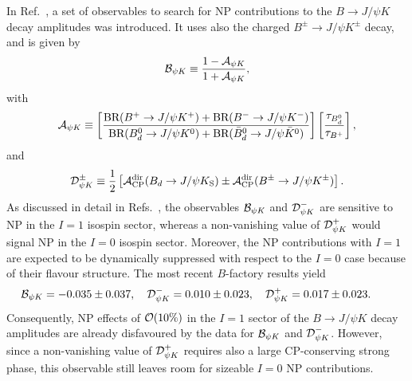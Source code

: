 \documentclass[11pt]{cernrep}
\begin{document}
In Ref.~\cite{FM-BpsiK}, a set of observables to search for NP contributions to 
the $B\to J/\psi K $ decay amplitudes was introduced. It
uses also the charged $B^\pm\to J/\psi K^\pm$ decay, and is given by
\begin{equation}\label{BpsiK}
{\cal B}_{\psi K}\equiv \frac{1-{\cal A}_{\psi K}}{1+{\cal A}_{\psi K}}, 
\end{equation}
with
\begin{equation}\label{ApsiK-def}
{\cal A}_{\psi K}\equiv\left[\frac{\mbox{BR}(B^+\to J/\psi K^+)+
\mbox{BR}(B^-\to J/\psi K^-)}{\mbox{BR}(B^0_d\to J/\psi K^0)+
\mbox{BR}(\bar B^0_d\to J/\psi\bar K^0)}
\right]\left[\frac{\tau_{B^0_d}}{\tau_{B^+}}\right],
\end{equation}
and
\begin{equation}\label{DpmPsiK}
{\cal D}^\pm_{\psi K}\equiv\frac{1}{2}\left[
{\cal A}_{\rm CP}^{\rm dir}(B_d\to J/\psi K_{\rm S})\pm
{\cal A}_{\rm CP}^{\rm dir}(B^\pm\to J/\psi K^\pm)\right].
\end{equation}
As discussed in detail in Refs.~\cite{RF-Phys-Rep,FM-BpsiK}, 
the observables ${\cal B}_{\psi K}$ 
and ${\cal D}^-_{\psi K}$ are sensitive to NP in the $I=1$ isospin sector, 
whereas a non-vanishing value of ${\cal D}^+_{\psi K}$ would signal NP in the
$I=0$ isospin sector. Moreover, the NP contributions with $I=1$ are expected
to be dynamically suppressed with respect to the $I=0$ case because of their 
flavour structure. The most recent $B$-factory results yield
\begin{equation}\label{B-Dpm-PsiK-res}
\hspace*{-0.7truecm} {\cal B}_{\psi K} =-0.035\pm0.037,\quad
{\cal D}^-_{\psi K}=0.010\pm0.023, \quad
{\cal D}^+_{\psi K}=0.017\pm0.023.
\end{equation}
Consequently, NP effects of ${\cal O}(10\%)$ in the $I=1$ sector of the 
$B\to J/\psi K$ decay amplitudes are already disfavoured by the
data for ${\cal B}_{\psi K}$ and ${\cal D}^-_{\psi K}$. However, since a 
non-vanishing value of ${\cal D}^+_{\psi K}$ requires also a large CP-conserving 
strong phase, this observable still leaves room for sizeable  $I=0$ NP 
contributions.

%
%
%
\end{document}
